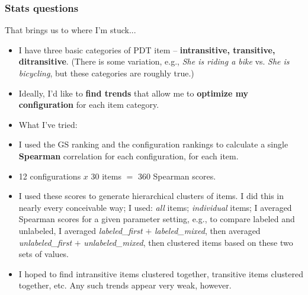 \documentclass[xcolor={dvipsnames}]{beamer}
\begin{document}
\begin{frame}
\frametitle{Stats questions}
\scriptsize
That brings us to where I'm stuck...

\begin{itemize}
\item I have three basic categories of PDT item -- \textbf{intransitive, transitive, ditransitive}. (There is some variation, e.g., \textit{She is riding a bike} vs. \textit{She is bicycling}, but these categories are roughly true.)
\item Ideally, I'd like to \textbf{find trends} that allow me to \textbf{optimize my configuration} for each item category.

\item What I've tried:

\item I used the GS ranking and the configuration rankings to calculate a single \textbf{Spearman} correlation for each configuration, for each item.
\item 12 configurations $x$ 30 items $=$ 360 Spearman scores.
\item I used these scores to generate hierarchical clusters of items. I did this in nearly every conceivable way; I used: \textit{all} items; \textit{individual} items; I averaged Spearman scores for a given parameter setting, e.g., to compare labeled and unlabeled, I averaged \textit{labeled\_first} $+$ \textit{labeled\_mixed}, then averaged \textit{unlabeled\_first} $+$ \textit{unlabeled\_mixed}, then clustered items based on these two sets of values.
\item I hoped to find intransitive items clustered together, transitive items clustered together, etc. Any such trends appear very weak, however.

\end{itemize}

\end{frame}
\end{document}
